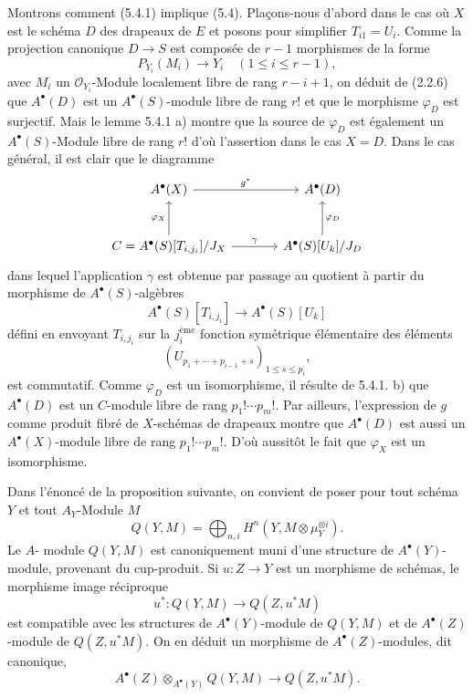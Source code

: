 Montrons comment (5.4.1) implique (5.4). Plaçons-nous d'abord dans le cas 
où $X$ est le
schéma $D$ des drapeaux de $E$ et posons pour simplifier $T_{i1}=U_i$. Comme la projection canonique $D\to S$ est composée de $r-1$ morphismes de la forme
\[
P_{Y_i}(M_i)\to Y_i\quad(1\le i\le r-1),
\]
avec $M_i$ un $\mathcal{O}_{Y_i}$-Module localement libre de rang $r-i+1$, on déduit de (2.2.6) que $A^{\bullet}(D)$ est un $A^{\bullet}(S)$-module libre de rang $r!$ et que le morphisme $\varphi_D$ est surjectif. Mais le lemme 5.4.1 a) montre que la source de $\varphi_D$ est également un $A^{\bullet}(S)$-Module libre de rang $r!$ d'où l'assertion dans le cas $X=D$. Dans le cas général, il est clair que le diagramme
\[
\begin{tikzcd}[column sep=large,row sep=large]
A^{\bullet}(X) \arrow[r,"g^*"] & A^{\bullet}(D)\\
C=A^{\bullet}(S)[T_{i,j_i}]/J_X \arrow[u,"\varphi_X"] \arrow[r,"\gamma"] &
A^{\bullet}(S)[U_k]/J_D \arrow[u,"\varphi_D"']
\end{tikzcd}
\]
dans lequel l'application $\gamma$ est obtenue par passage au quotient à partir du morphisme de $A^{\bullet}(S)$-algèbres
\[
A^\bullet(S)[T_{i,j_i}]\to A^\bullet(S)[U_k]
\]
défini en envoyant $T_{i,j_i}$ sur la $j_i^{\text{ème}}$ fonction symétrique élémentaire des éléments
\[
(U_{p_1+\cdots+p_{i-1}+s})_{1\le s\le p_i},
\]
est commutatif. Comme $\varphi_D$ est un isomorphisme, il résulte de 5.4.1. b) que $A^{\bullet}(D)$ est un $C$-module libre de rang $p_1!\cdots p_m!$. Par ailleurs, l'expression de $g$ comme produit fibré de $X$-schémas de drapeaux montre que $A^{\bullet}(D)$ est aussi un $A^{\bullet}(X)$-module libre de rang $p_1!\cdots p_m!$. D'où aussitôt le fait que $\varphi_X$ est un isomorphisme.

Dans l'énoncé de la proposition suivante, on convient de poser pour tout schéma $Y$ et tout $A_Y$-Module $M$
\[
Q(Y,M)=\bigoplus_{n,i}H^n(Y,M\otimes\mu_Y^{\otimes i}).
\]
Le $A$-
module $Q(Y,M)$ est canoniquement muni d'une structure de $A^\bullet(Y)$-module, provenant du cup-produit. Si $u:Z\to Y$ est un morphisme de schémas, le morphisme image réciproque
\[
u^*:Q(Y,M)\to Q(Z,u^*M)
\]
est compatible avec les structures de $A^\bullet(Y)$-module de $Q(Y,M)$ et de $A^\bullet(Z)$-module de $Q(Z,u^*M)$. On en déduit un morphisme de $A^\bullet(Z)$-modules, dit canonique,
\[
A^\bullet(Z)\otimes_{A^\bullet(Y)}Q(Y,M)\to Q(Z,u^*M).
\]

